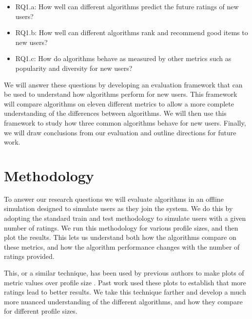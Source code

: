 \documentclass[letterpaper]{sig-alternate}
\begin{document}
  \begin{itemize}
  \item RQ1.a: How well can different algorithms predict the future ratings of new users?
  \item RQ1.b: How well can different algorithms rank and recommend good items to new users?
  \item RQ1.c: How do algorithms behave as measured by other metrics such as popularity and diversity for new users?
  \end{itemize}

  We will answer these questions by developing an evaluation framework that can be used to understand how algorithms perform for new users.
  This framework will compare algorithms on eleven different metrics to allow a more complete understanding of the differences between algorithms.
  We will then use this framework to study how three common algorithms behave for new users.
  Finally, we will draw conclusions from our evaluation and outline directions for future work.

\section{Methodology}
\label{sec:methodology}

  To answer our research questions we will evaluate algorithms in an offline simulation designed to simulate users as they join the system.
  We do this by adopting the standard train and test methodology to simulate users with a given number of ratings.
  We run this methodology for various profile sizes, and then plot the results.
  This lets us understand both how the algorithms compare on these metrics, and how the algorithm performance changes with the number of ratings provided.

  This, or a similar technique, has been used by previous authors to make plots of metric values over profile size \cite{DrennerInitialExperiance, TenIsEnough, AdaptiveBootstrap, LathiaTemporal}.
  Past work used these plots to establish that more ratings lead to better results.
  We take this technique farther and develop a much more nuanced understanding of the different algorithms, and how they compare for different profile sizes.
\end{document}
